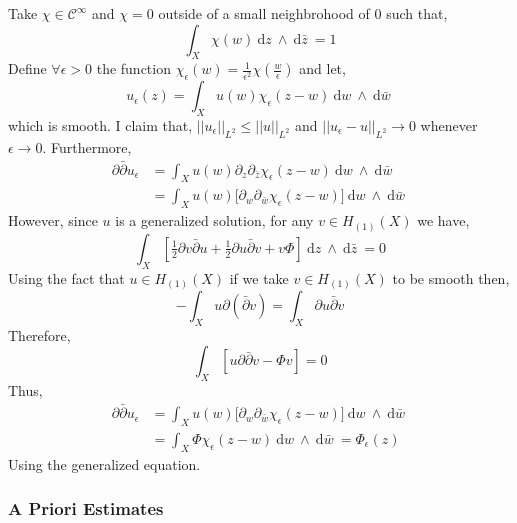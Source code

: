 \documentclass[12pt]{extarticle}
\renewcommand{\d}[1]{\: \mathrm{d}#1 \:}
\theoremstyle{definition}
\begin{document}
Take $\chi \in \mathcal{C}^{\infty}$ and $\chi = 0$ outside of a small neighbrohood of $0$ such that,
\[ \int_X \chi(w) \d{z} \wedge \d{\bar{z}} = 1 \]
Define $\forall \epsilon > 0$ the function $\chi_{\epsilon}(w) = \frac{1}{\epsilon^2} \chi{\left( \frac{w}{\epsilon} \right)}$ and let,
\[ u_{\epsilon}(z) = \int_X u(w) \chi_{\epsilon}(z - w) \d{w} \wedge \d{\bar{w}} \]
which is smooth. I claim that, 
$||u_{\epsilon}||_{L^2} \le ||u||_{L^2}$ and $||u_{\epsilon} - u||_{L^2} \to 0$ whenever $\epsilon \to 0$. Furthermore,
\begin{align*}
\partial \bar{\partial} u_{\epsilon} & = \int_X u(w) \partial_z \partial_{\bar{z}} \chi_{\epsilon}(z - w) \d{w} \wedge \d{\bar{w}}
\\
& = \int_X u(w) \Big[ \partial_w \partial_{\bar{w}} \chi_{\epsilon}(z - w) \Big] \d{w} \wedge \d{\bar{w}}    
\end{align*}
However, since $u$ is a generalized solution, for any $v \in H_{(1)}(X)$ we have,
\[ \int_X \left[ \tfrac{1}{2} \partial v \bar{\partial} u + \tfrac{1}{2} \partial u \bar{\partial} v + v \Phi \right] \d{z} \wedge \d{\bar{z}} = 0 \]
Using the fact that $u \in H_{(1)}(X)$ if we take $v \in H_{(1)}(X)$ to be smooth then,
\[ -\int_X u \partial (\bar{\partial} v) = \int_X \partial u \bar{\partial} v \]
Therefore,
\[ \int_X \left[ u \partial \bar{\partial} v - \Phi v \right] = 0 \]
Thus,
\begin{align*}
\partial \bar{\partial} u_{\epsilon} & = \int_X u(w) \Big[ \partial_w  \partial_{\bar{w}} \chi_{\epsilon}(z - w) \Big] \d{w} \wedge \d{\bar{w}}  
\\
& = \int_X \Phi \chi_{\epsilon}(z - w)  \d{w} \wedge \d{\bar{w}}   = \Phi_{\epsilon}(z)
\end{align*}
Using the generalized equation. 

\subsubsection{A Priori Estimates}
\end{document}
